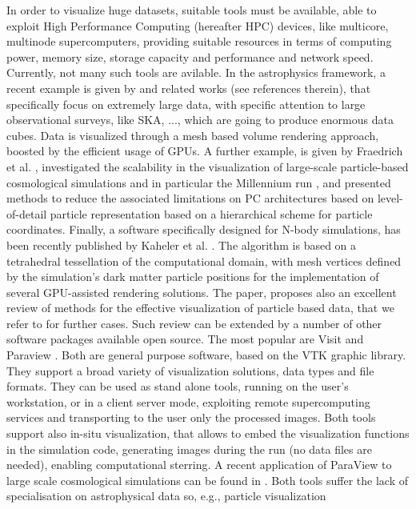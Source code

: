 \documentclass[11pt]{article}
\begin{document}
In order to visualize huge datasets, suitable tools must be available, able to 
exploit High Performance Computing (hereafter HPC) devices, like multicore, multinode
supercomputers, providing suitable resources in terms of computing power, memory size, 
storage capacity and performance and network speed. Currently, not many such tools are avilable.
In the astrophysics framework, a recent example is given by \cite{2012ASPC..461...45H} and
related works (see references therein), 
that specifically focus on extremely 
large data, with specific attention to large observational surveys, like 
SKA, ..., which are going to produce enormous data cubes. Data is visualized 
through a mesh based volume rendering approach, boosted by the efficient usage 
of GPUs. A further example, is given by Fraedrich et al. \cite{Fraedrich:2009:TMV},
investigated the scalability in the visualization of large-scale particle-based cosmological 
simulations and in particular the Millennium run \cite{millennium}, and presented methods to reduce the 
associated limitations on PC architectures based on level-of-detail particle 
representation based on a hierarchical scheme for particle coordinates.
Finally, a software specifically designed for N-body simulations,
has been recently published by Kaheler et al. \cite{2012arXiv1208.3206K}. 
The algorithm is based on a tetrahedral tessellation of the computational domain, 
with mesh vertices defined by the simulation's dark matter particle positions
for the implementation of several GPU-assisted rendering solutions. The paper, proposes
also an excellent review 
of methods for the effective visualization of particle based data, that we refer to for
further cases.
Such review can be extended by a number of other software packages available
open source. The most popular are Visit \cite{visit} and Paraview \cite{paraview}. 
Both are general purpose software, based
on the VTK \cite{vtk} graphic library. They support a broad variety of visualization solutions, data types
and file formats. They can be used as stand alone tools, running on the user's workstation, 
or in a client server mode, exploiting remote supercomputing services and transporting
to the user only the processed images. Both tools support also in-situ visualization, 
that allows to embed the visualization functions in the simulation code, generating images
during the run (no data files are needed), enabling computational sterring. 
A recent application of ParaView 
to large scale cosmological simulations can be found in \cite{2011ApJS..195...11W}. 
Both tools suffer the lack
of specialisation on astrophysical data so, e.g., particle visualization 
\end{document}
